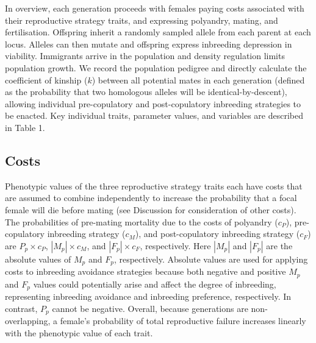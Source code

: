 \documentclass[10pt,letterpaper]{article}
\begin{document}
In overview, each generation proceeds with females paying costs associated with their reproductive strategy traits, and expressing polyandry, mating, and fertilisation. Offspring inherit a randomly sampled allele from each parent at each locus. Alleles can then mutate and offspring express inbreeding depression in viability. Immigrants arrive in the population and density regulation limits population growth. We record the population pedigree and directly calculate the coefficient of kinship ($k$) between all potential mates in each generation (defined as the probability that two homologous alleles will be identical-by-descent), allowing individual pre-copulatory and post-copulatory inbreeding strategies to be enacted. Key individual traits, parameter values, and variables are described in Table 1.

\subsection*{Costs}

Phenotypic values of the three reproductive strategy traits each have costs that are assumed to combine independently to increase the probability that a focal female will die before mating (see Discussion for consideration of other costs). The probabilities of pre-mating mortality due to the costs of polyandry ($c_{P}$), pre-copulatory inbreeding strategy ($c_{M}$), and post-copulatory inbreeding strategy ($c_{F}$) are $P_{p} \times c_{P}$, $|M_{p}| \times c_{M}$, and $|F_{p}| \times c_{F}$, respectively. Here $|M_{p}|$ and $|F_{p}|$ are the absolute values of $M_{p}$ and $F_{p}$, respectively. Absolute values are used for applying costs to inbreeding avoidance strategies because both negative and positive $M_{p}$ and $F_{p}$ values could potentially arise and affect the degree of inbreeding, representing inbreeding avoidance and inbreeding preference, respectively. In contrast, $P_{p}$ cannot be negative. Overall, because generations are non-overlapping, a female's probability of total reproductive failure increases linearly with the phenotypic value of each trait.

\vspace{5 mm}
\end{document}
